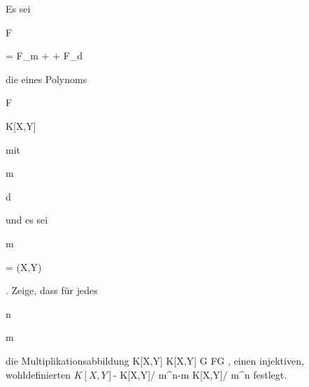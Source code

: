 {


Es sei


\mavergleichskette

{\vergleichskette

{F
}

{ = }{ F_m + \cdots + F_d
}

{  }{
}

{    }{
}

{   }{
}

}
{}{}{}
die
eines Polynoms


\mavergleichskette

{\vergleichskette

{F
}

{ \in }{ K[X,Y]
}

{  }{
}

{    }{
}

{   }{
}

}
{}{}{}
mit


\mavergleichskette

{\vergleichskette

{m
}

{ \leq }{d
}

{  }{
}

{    }{
}

{   }{
}

}
{}{}{}
und es sei


\mavergleichskette

{\vergleichskette

{ {\mathfrak m}
}

{ = }{ (X,Y)
}

{  }{
}

{    }{
}

{   }{
}

}
{}{}{.}
Zeige, dass für jedes


\mavergleichskette

{\vergleichskette

{n
}

{ \geq }{m
}

{  }{
}

{    }{
}

{   }{
}

}
{}{}{}
die Multiplikationsabbildung
\maabbeledisp {} {K[X,Y] } { K[X,Y]
} { G } { FG
} {,}
einen injektiven, wohldefinierten
$K[X,Y]$-
\maabbdisp {} {K[X,Y]/ {\mathfrak m}^{n-m} } { K[X,Y]/ {\mathfrak m}^{n}
} {}
festlegt.


}

